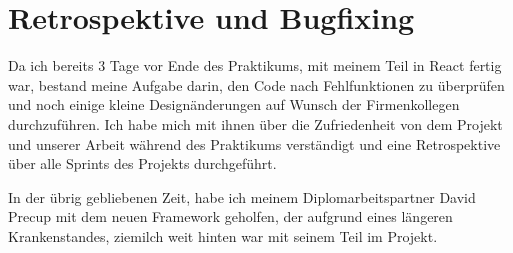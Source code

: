 \section{Retrospektive und Bugfixing}
Da ich bereits 3 Tage vor Ende des Praktikums, mit meinem Teil in React fertig war,
bestand meine Aufgabe darin, den Code nach Fehlfunktionen zu überprüfen und noch einige 
kleine Designänderungen auf Wunsch der Firmenkollegen durchzuführen. Ich habe mich mit 
ihnen über die Zufriedenheit von dem Projekt und unserer Arbeit während des Praktikums 
verständigt und eine Retrospektive über alle Sprints des Projekts durchgeführt. 

In der übrig gebliebenen Zeit, habe ich meinem Diplomarbeitspartner David Precup mit dem neuen Framework geholfen, der 
aufgrund eines längeren Krankenstandes, ziemilch weit hinten war mit seinem Teil im Projekt. 
  
 











